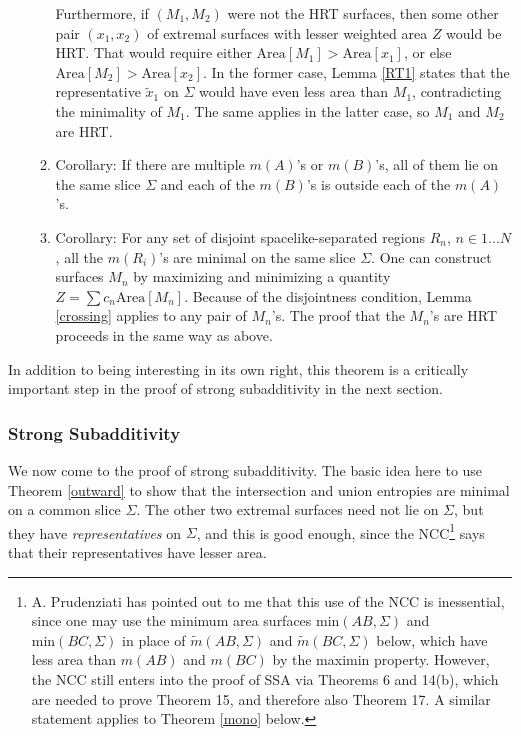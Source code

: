 \documentclass{article}
\begin{document}
\begin{enumerate}[resume]
\begin{enumerate}
Furthermore, if $(M_1, M_2)$ were not the HRT surfaces, then some other pair $(x_1, x_2)$ of extremal surfaces with lesser weighted area $Z$ would be HRT.  That would require either $\mathrm{Area}[M_1] > \mathrm{Area}[x_1]$, or else $\mathrm{Area}[M_2] > \mathrm{Area}[x_2]$.  In the former case, Lemma \ref{RT1} states that the representative $\tilde{x}_1$ on $\Sigma$ would have even less area than $M_1$, contradicting the minimality of $M_1$.  The same applies in the latter case, so $M_1$ and $M_2$ are HRT.
	\item Corollary: If there are multiple $m(A)$'s or $m(B)$'s, all of them lie on the same slice $\Sigma$ and each of the $m(B)$'s is outside each of the $m(A)$'s.
	\item \label{multiR} Corollary: For any set of disjoint spacelike-separated regions $R_n$, $n \in 1...N$, all the $m(R_i)$'s are minimal on the same slice $\Sigma$.  One can construct surfaces $M_n$ by maximizing and minimizing a quantity $Z = \sum c_n \mathrm{Area}[M_n]$.  Because of the disjointness condition, Lemma \ref{crossing} applies to any pair of $M_n$'s.  The proof that the $M_n$'s are HRT proceeds in the same way as above.
	\end{enumerate}
\end{enumerate}
In addition to being interesting in its own right, this theorem is a critically important step in the proof of strong subadditivity in the next section.

\subsubsection{Strong Subadditivity}\label{STR}

We now come to the proof of strong subadditivity.  The basic idea here to use Theorem \ref{outward} to show that the intersection and union entropies are minimal on a common slice $\Sigma$.  The other two extremal surfaces need not lie on $\Sigma$, but they have \emph{representatives} on $\Sigma$, and this is good enough, since the NCC\footnote{A. Prudenziati has pointed out to me that this use of the NCC is inessential, since one may use the minimum area surfaces $\text{min}(AB, \Sigma)$ and $\text{min}(BC,\Sigma)$ in place of $\tilde{m}(AB,\Sigma)$ and $\tilde{m}(BC,\Sigma)$ below, which have less area than $m(AB)$ and $m(BC)$ by the maximin property.  However, the NCC still enters into the proof of SSA via Theorems 6 and 14(b), which are needed to prove Theorem 15, and therefore also Theorem 17.  A similar statement applies to Theorem \ref{mono} below.} says that their representatives have lesser area.
\end{document}
